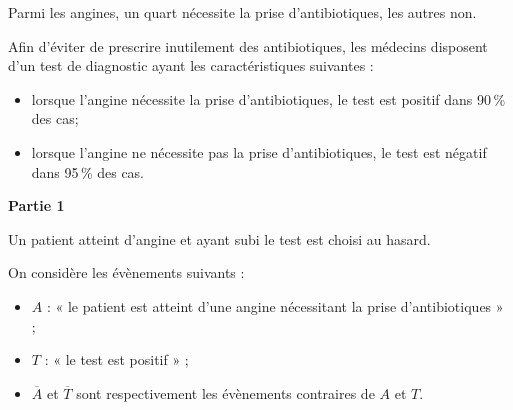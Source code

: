 \medskip

Parmi les angines, un quart nécessite la prise d'antibiotiques, les autres non.

Afin d'éviter de prescrire inutilement des antibiotiques, les médecins disposent d'un test de diagnostic ayant les caractéristiques suivantes :

\begin{itemize}
\item[$\bullet~~$]lorsque l'angine nécessite la prise d'antibiotiques, le test est positif dans 90\,\% des cas;
\item[$\bullet~~$]lorsque l'angine ne nécessite pas la prise d'antibiotiques, le test est négatif dans 95\,\% des cas.
\end{itemize}





\bigskip

\textbf{Partie 1}

\medskip

Un patient atteint d'angine et ayant subi le test est choisi au hasard. 

On considère les évènements suivants :

\begin{itemize}
\item[$\bullet~~$]$A$ : « le patient est atteint d'une angine nécessitant la prise d'antibiotiques »{} ; 
\item[$\bullet~~$]$T$ : « le test est positif »{} ;
\item[$\bullet~~$]$\overline{A}$ et $\overline{T}$ sont respectivement les évènements contraires de $A$ et $T$.
\end{itemize}



